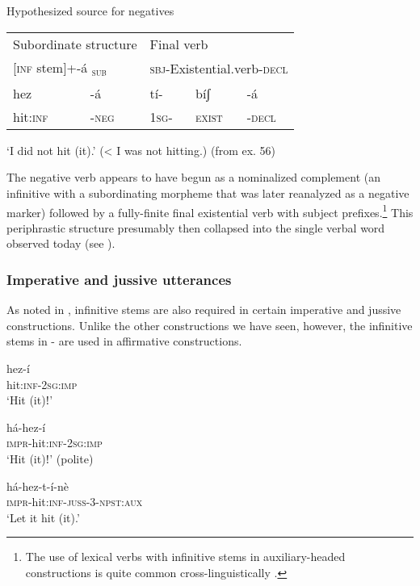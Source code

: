 \documentclass[output=paper]{langsci/langscibook}
\begin{document}
\ea\label{ex:mahland:60}{Hypothesized source for negatives}\\
\begin{tabular}{lllll}
\multicolumn{2}{l}{Subordinate structure} & \multicolumn{3}{l}{Final verb} \\
\multicolumn{2}{l}{[\textsc{inf} stem]+-á \textsubscript{\textsc{sub}}} & \multicolumn{3}{l}{\textsc{sbj}{}-Existential.verb-\textsc{decl}} \\
hez       &         {}-á         &        tí-        &   bíʃ   &   {}-á\\
hit\textsc{:inf}      &    \textsc{{}-neg} & \textsc{1sg}{}-   &   \textsc{exist} &  \textsc{{}-decl} \\
\end{tabular}
\glt `I did not hit (it).' ({\textless} I was not hitting.)  (from ex. 56)
\z
 
The negative verb appears to have begun as a nominalized complement (an infinitive with a subordinating morpheme that was later reanalyzed as a negative marker) followed by a fully-finite final existential verb with subject prefixes.\footnote{The use of lexical verbs with infinitive stems in auxiliary-headed constructions is quite common cross-linguistically \citep[56]{Anderson2006}.} This periphrastic structure presumably then collapsed into the single verbal word observed today (see ).

\subsubsection{Imperative and jussive utterances}\label{sec:mahland:3.1.2}


As noted in , infinitive stems are also required in certain imperative and jussive constructions. Unlike the other constructions we have seen, however, the infinitive stems in - are used in affirmative constructions. 

\ea\label{ex:mahland:61}
\gll hez-í\\
hit:\textsc{inf-2sg:imp}\\
\glt `Hit (it)ǃ'
\z

\ea\label{ex:mahland:62}
\gll há-hez-í\\
\textsc{impr}{}-hit\textsc{:inf-2sg:imp}\\
\glt `Hit (it)ǃ' (polite)
\z

\ea\label{ex:mahland:63}
\gll há-hez-t-í-nè\\
\textsc{impr}{}-hit:\textsc{inf-juss-3-npst:aux}\\
\glt `Let it hit (it).'
\z
\end{document}
